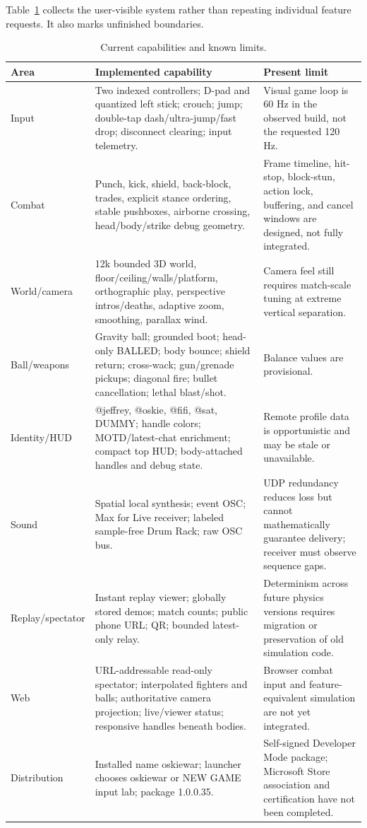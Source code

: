\documentclass[10pt,letterpaper,twocolumn]{article}
\begin{document}
Table~\ref{tab:capabilities} collects the user-visible system rather than repeating individual feature requests. It also marks unfinished boundaries.

\begin{table}[t]
\centering
\caption{Current capabilities and known limits.}
\label{tab:capabilities}
\small
\begin{tabularx}{\textwidth}{@{}p{}X p{}@{}}
\toprule
Area & Implemented capability & Present limit \\
\midrule
Input & Two indexed controllers; D-pad and quantized left stick; crouch; jump; double-tap dash/ultra-jump/fast drop; disconnect clearing; input telemetry. & Visual game loop is 60 Hz in the observed build, not the requested 120 Hz.\\
Combat & Punch, kick, shield, back-block, trades, explicit stance ordering, stable pushboxes, airborne crossing, head/body/strike debug geometry. & Frame timeline, hit-stop, block-stun, action lock, buffering, and cancel windows are designed, not fully integrated.\\
World/camera & 12k bounded 3D world, floor/ceiling/walls/platform, orthographic play, perspective intros/deaths, adaptive zoom, smoothing, parallax wind. & Camera feel still requires match-scale tuning at extreme vertical separation.\\
Ball/weapons & Gravity ball; grounded boot; head-only BALLED; body bounce; shield return; cross-wack; gun/grenade pickups; diagonal fire; bullet cancellation; lethal blast/shot. & Balance values are provisional.\\
Identity/HUD & @jeffrey, @oskie, @fifi, @sat, DUMMY; handle colors; MOTD/latest-chat enrichment; compact top HUD; body-attached handles and debug state. & Remote profile data is opportunistic and may be stale or unavailable.\\
Sound & Spatial local synthesis; event OSC; Max for Live receiver; labeled sample-free Drum Rack; raw OSC bus. & UDP redundancy reduces loss but cannot mathematically guarantee delivery; receiver must observe sequence gaps.\\
Replay/spectator & Instant replay viewer; globally stored demos; match counts; public phone URL; QR; bounded latest-only relay. & Determinism across future physics versions requires migration or preservation of old simulation code.\\
Web & URL-addressable read-only spectator; interpolated fighters and balls; authoritative camera projection; live/viewer status; responsive handles beneath bodies. & Browser combat input and feature-equivalent simulation are not yet integrated.\\
Distribution & Installed name oskiewar; launcher chooses oskiewar or NEW GAME input lab; package 1.0.0.35. & Self-signed Developer Mode package; Microsoft Store association and certification have not been completed.\\
\bottomrule
\end{tabularx}
\end{table}
\end{document}
